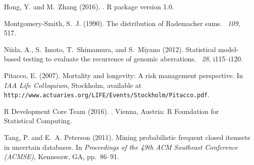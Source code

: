 \documentclass[12pt]{article}
\begin{document}
\begin{thebibliography}{}
Hong, Y. and M.~Zhang (2016).
.
\newblock R package version 1.0.

Montgomery-Smith, S.~J. (1990).
\newblock The distribution of Rademacher sums.
~{\em 109},
  517.

Niida, A., S.~Imoto, T.~Shimamura, and S.~Miyano (2012).
\newblock Statistical model-based testing to evaluate the recurrence of genomic
  aberrations.
~{\em 28}, i115--i120.

Pitacco, E. (2007).
\newblock Mortality and longevity: A risk management perspective.
\newblock In {\em IAA Life Colloquium}, Stockholm, available at\\
  \texttt{http://www.actuaries.org/LIFE/Events/Stockholm/Pitacco.pdf}.

{R Development Core Team} (2016).
.
\newblock Vienna, Austria: R Foundation for Statistical Computing.

Tang, P. and E.~A. Peterson (2011).
\newblock Mining probabilistic frequent closed itemsets in uncertain databases.
\newblock In {\em Proceedings of the 49th ACM Southeast Conference (ACMSE)},
  Kennesaw, GA, pp.\  86--91.

\end{thebibliography}
\end{document}
